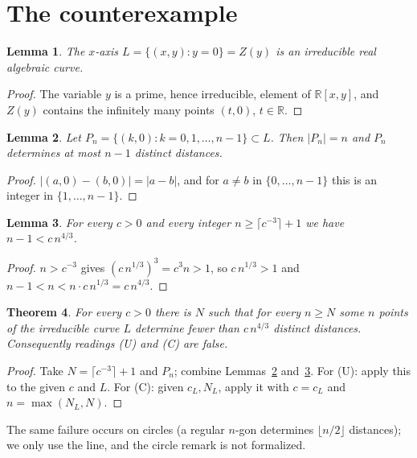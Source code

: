 \documentclass[11pt]{article}
\newtheorem{theorem}{Theorem}
\newtheorem{lemma}[theorem]{Lemma}
\theoremstyle{definition}
\begin{document}
\section{The counterexample}
\begin{lemma}\label{lem:curve}
The $x$-axis $L=\{(x,y): y=0\}=Z(y)$ is an irreducible real algebraic curve.
\end{lemma}
\begin{proof}
The variable $y$ is a prime, hence irreducible, element of $\mathbb R[x,y]$, and $Z(y)$ contains
the infinitely many points $(t,0)$, $t\in\mathbb R$.
\end{proof}

\begin{lemma}\label{lem:count}
Let $P_n=\{(k,0): k=0,1,\dots,n-1\}\subset L$. Then $|P_n|=n$ and $P_n$ determines at most $n-1$
distinct distances.
\end{lemma}
\begin{proof}
$|(a,0)-(b,0)|=|a-b|$, and for $a\neq b$ in $\{0,\dots,n-1\}$ this is an integer in
$\{1,\dots,n-1\}$.
\end{proof}

\begin{lemma}\label{lem:growth}
For every $c>0$ and every integer $n\ge \lceil c^{-3}\rceil+1$ we have $n-1<c\,n^{4/3}$.
\end{lemma}
\begin{proof}
$n>c^{-3}$ gives $(c\,n^{1/3})^3=c^3n>1$, so $c\,n^{1/3}>1$ and
$n-1<n<n\cdot c\,n^{1/3}=c\,n^{4/3}$.
\end{proof}

\begin{theorem}\label{thm:main}
For every $c>0$ there is $N$ such that for every $n\ge N$ some $n$ points of the irreducible curve
$L$ determine fewer than $c\,n^{4/3}$ distinct distances. Consequently readings (U) and (C) are
false.
\end{theorem}
\begin{proof}
Take $N=\lceil c^{-3}\rceil+1$ and $P_n$; combine Lemmas~\ref{lem:count} and~\ref{lem:growth}.
For (U): apply this to the given $c$ and $L$. For (C): given $c_L,N_L$, apply it with $c=c_L$
and $n=\max(N_L,N)$.
\end{proof}
The same failure occurs on circles (a regular $n$-gon determines $\lfloor n/2\rfloor$ distances);
we only use the line, and the circle remark is not formalized.
\end{document}
